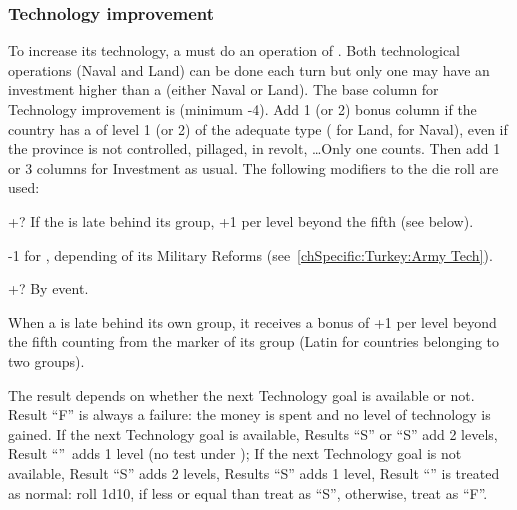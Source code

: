 \subsubsection{Technology improvement}\label{chExpenses:Technology
  Improvement}
\bparag To increase its technology, a \MAJ must do an operation of
. Both technological operations (Naval and Land)
can be done each turn but only one may have an investment higher than a
 (either Naval or Land).
\bparag[Resolution] The base column for Technology improvement is 
(minimum -4).
\bparag Add 1 (or 2) bonus column if the country has a \MNU of level 1 (or 2)
of the adequate type ( for Land,  for Naval), even
if the province is not controlled, pillaged, in revolt, \ldots Only one \MNU
counts.
\bparag Then add 1 or 3 columns for Investment as usual.
\bparag The following modifiers to the die roll are used:
\begin{modlist}
\item[+?] If the \MAJ is late behind its group, +1 per level beyond the fifth
  (see below).
\item[-1] for \TUR, depending of its Military Reforms
  (see~\ref{chSpecific:Turkey:Army Tech}).
\item[+?] By event.
\end{modlist}
\bparag When a \MAJ is late behind its own group, it receives a bonus of +1
per level beyond the fifth counting from the marker of its group (Latin for
countries belonging to two groups).

The result depends on whether the next Technology goal is available or not.
\bparag Result ``F'' is always a failure: the money is spent and no level of
technology is gained.
\bparag If the next Technology goal is available, Results ``S'' or
``S\textetoile'' add 2 levels, Result ``\undemi''\ adds 1 level (no test under
\FTI);
\bparag If the next Technology goal is not available, Result ``S\textetoile''
adds 2 levels, Results ``S'' adds 1 level, Result ``\undemi'' is treated as
normal: roll 1d10, if less or equal than \FTI treat as ``S'', otherwise, treat
as ``F''.

